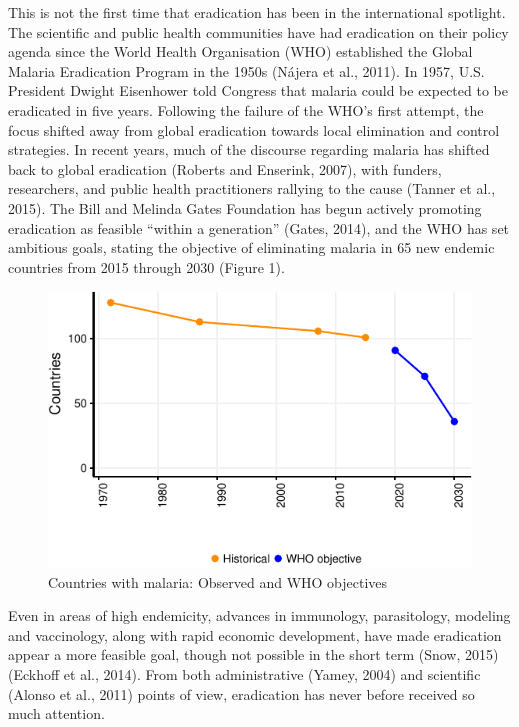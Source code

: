 \documentclass[]{article}
\begin{document}
This is not the first time that eradication has been in the
international spotlight. The scientific and public health communities
have had eradication on their policy agenda since the World Health
Organisation (WHO) established the Global Malaria Eradication Program in
the 1950s (Nájera et al., 2011). In 1957, U.S. President Dwight
Eisenhower told Congress that malaria could be expected to be eradicated
in five years. Following the failure of the WHO's first attempt, the
focus shifted away from global eradication towards local elimination and
control strategies. In recent years, much of the discourse regarding
malaria has shifted back to global eradication (Roberts and Enserink,
2007), with funders, researchers, and public health practitioners
rallying to the cause (Tanner et al., 2015). The Bill and Melinda Gates
Foundation has begun actively promoting eradication as feasible ``within
a generation'' (Gates, 2014), and the WHO has set ambitious goals,
stating the objective of eliminating malaria in 65 new endemic countries
from 2015 through 2030 (Figure 1).

\begin{figure}[h]

{\centering \includegraphics{paper_files/figure-latex/unnamed-chunk-4-1} 

}

\caption{Countries with malaria: Observed and WHO objectives}\label{fig:unnamed-chunk-4}
\end{figure}

Even in areas of high endemicity, advances in immunology, parasitology,
modeling and vaccinology, along with rapid economic development, have
made eradication appear a more feasible goal, though not possible in the
short term (Snow, 2015) (Eckhoff et al., 2014). From both administrative
(Yamey, 2004) and scientific (Alonso et al., 2011) points of view,
eradication has never before received so much attention.
\end{document}
